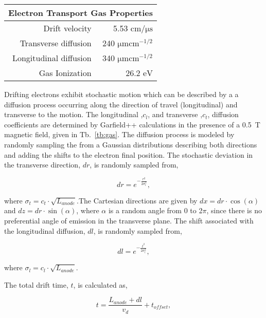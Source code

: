 \begin{table*}\centering
{}
\begin{tabular}{@{}rr@{}}\toprule 
\multicolumn{2}{c}{Electron Transport Gas Properties} \\
 \midrule
Drift velocity & 5.53 $\si{\centi\meter\per\micro\second}$\\
Transverse diffusion & 240 $\si{\micro \meter \centi\meter}^{-1/2}$\\
Longitudinal diffusion &  340 $\si{\micro \meter \centi\meter}^{-1/2}$\\
Gas Ionization & 26.2 $\si{\eV}$\\
\bottomrule
\end{tabular}
\caption{An overview of the properties of the TPC}
\label{tb:gas}
\end{table*}

Drifting electrons exhibit stochastic motion which can be described by a a diffusion process occurring along the direction of travel (longitudinal) and transverse to the motion. The longitudinal ,$c_{l}$, and transverse ,$c_{t}$, diffusion coefficients are determined by Garfield++ calculations in the presence of a \SI{0.5}{\tesla} magnetic field, given in Tb.~\ref{tb:gas}. The diffusion process is modeled by randomly sampling the from a Gaussian distributions describing both directions and adding the shifts to the electron final position. The stochastic deviation in the transverse direction, $dr$, is randomly sampled from,

\begin{equation}
dr = e^{-\frac{r^2}{2\sigma_{t}^2}},
\end{equation}

where $\sigma_{t}=c_{t}\cdot\sqrt{L_{anode}}$.The Cartesian directions are given by $dx = dr \cdot \cos(\alpha)$ and $dz = dr \cdot \sin(\alpha)$, where $\alpha$ is a random angle from 0 to 2$\pi$, since there is no preferential angle  of emission in the transverse plane. The shift associated with the longitudinal diffusion, $dl$, is randomly sampled from, 

\begin{equation}
dl = e^{-\frac{t^2}{2\sigma_{l}^2}},
\end{equation}

where $\sigma_{l}=c_{l}\cdot\sqrt{L_{anode}}$. 

The total drift time, $t$, is calculated as,

\begin{equation}
 t = \frac{L_{anode} + dl}{v_d} + t_{offset},
\end{equation}
 
